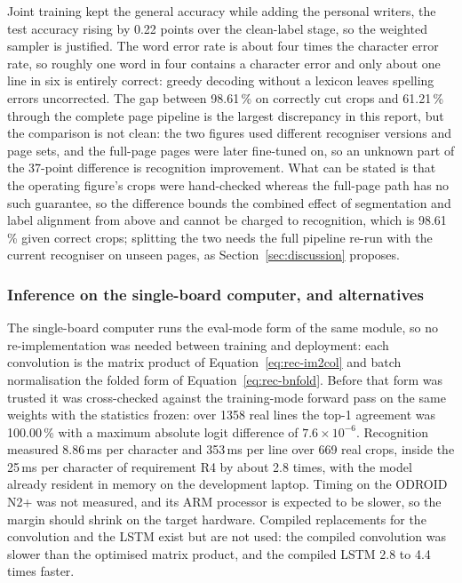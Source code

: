 Joint training kept the general accuracy while adding the personal writers, the test accuracy rising by 0.22 points over the clean-label stage, so the weighted sampler is justified.
The word error rate is about four times the character error rate, so roughly one word in four contains a character error and only about one line in six is entirely correct: greedy decoding without a lexicon leaves spelling errors uncorrected.
The gap between 98.61\,\% on correctly cut crops and 61.21\,\% through the complete page pipeline is the largest discrepancy in this report, but the comparison is not clean: the two figures used different recogniser versions and page sets, and the full-page pages were later fine-tuned on, so an unknown part of the 37-point difference is recognition improvement.
What can be stated is that the operating figure's crops were hand-checked whereas the full-page path has no such guarantee, so the difference bounds the combined effect of segmentation and label alignment from above and cannot be charged to recognition, which is 98.61\,\% given correct crops; splitting the two needs the full pipeline re-run with the current recogniser on unseen pages, as Section~\ref{sec:discussion} proposes.

\subsubsection{Inference on the single-board computer, and alternatives}
\label{sec:rec-board}

The single-board computer runs the eval-mode form of the same module, so no re-implementation was needed between training and deployment: each convolution is the matrix product of Equation~\ref{eq:rec-im2col} and batch normalisation the folded form of Equation~\ref{eq:rec-bnfold}.
Before that form was trusted it was cross-checked against the training-mode forward pass on the same weights with the statistics frozen: over 1358 real lines the top-1 agreement was 100.00\,\% with a maximum absolute logit difference of $7.6\times10^{-6}$.
Recognition measured 8.86\,ms per character and 353\,ms per line over 669 real crops, inside the 25\,ms per character of requirement R4 by about 2.8 times, with the model already resident in memory on the development laptop.
Timing on the ODROID N2+ was not measured, and its ARM processor is expected to be slower, so the margin should shrink on the target hardware.
Compiled replacements for the convolution and the LSTM exist but are not used: the compiled convolution was slower than the optimised matrix product, and the compiled LSTM 2.8 to 4.4 times faster.

